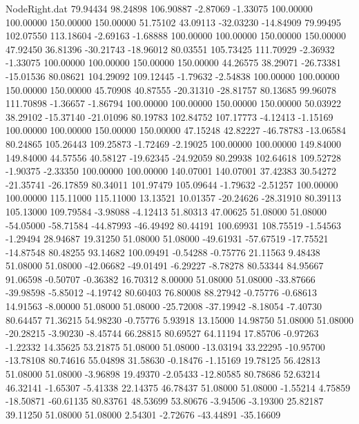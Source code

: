 \begin{filecontents}{NodeRight.dat}
  79.94434   98.24898  106.90887    -2.87069   -1.33075  100.00000  100.00000  150.00000  150.00000   51.75102   43.09113  -32.03230  -14.84909
  79.99495  102.07550  113.18604    -2.69163   -1.68888  100.00000  100.00000  150.00000  150.00000   47.92450   36.81396  -30.21743  -18.96012
  80.03551  105.73425  111.70929    -2.36932   -1.33075  100.00000  100.00000  150.00000  150.00000   44.26575   38.29071  -26.73381  -15.01536
  80.08621  104.29092  109.12445    -1.79632   -2.54838  100.00000  100.00000  150.00000  150.00000   45.70908   40.87555  -20.31310  -28.81757
  80.13685   99.96078  111.70898    -1.36657   -1.86794  100.00000  100.00000  150.00000  150.00000   50.03922   38.29102  -15.37140  -21.01096
  80.19783  102.84752  107.17773    -4.12413   -1.15169  100.00000  100.00000  150.00000  150.00000   47.15248   42.82227  -46.78783  -13.06584
  80.24865  105.26443  109.25873    -1.72469   -2.19025  100.00000  100.00000  149.84000  149.84000   44.57556   40.58127  -19.62345  -24.92059
  80.29938  102.64618  109.52728    -1.90375   -2.33350  100.00000  100.00000  140.07001  140.07001   37.42383   30.54272  -21.35741  -26.17859
  80.34011  101.97479  105.09644    -1.79632   -2.51257  100.00000  100.00000  115.11000  115.11000   13.13521   10.01357  -20.24626  -28.31910
  80.39113  105.13000  109.79584    -3.98088   -4.12413   51.80313   47.00625   51.08000   51.08000  -54.05000  -58.71584  -44.87993  -46.49492
  80.44191  100.69931  108.75519    -1.54563   -1.29494   28.94687   19.31250   51.08000   51.08000  -49.61931  -57.67519  -17.75521  -14.87548
  80.48255   93.14682  100.09491    -0.54288   -0.75776   21.11563    9.48438   51.08000   51.08000  -42.06682  -49.01491   -6.29227   -8.78278
  80.53344   84.95667   91.06598    -0.50707   -0.36382   16.70312    8.00000   51.08000   51.08000  -33.87666  -39.98598   -5.85012   -4.19742
  80.60403   76.80008   88.27942    -0.75776   -0.68613   14.91563   -8.00000   51.08000   51.08000  -25.72008  -37.19942   -8.18054   -7.40730
  80.64457   71.36215   54.98230    -0.75776    5.93918   13.15000   14.98750   51.08000   51.08000  -20.28215   -3.90230   -8.45744   66.28815
  80.69527   64.11194   17.85706    -0.97263   -1.22332   14.35625   53.21875   51.08000   51.08000  -13.03194   33.22295  -10.95700  -13.78108
  80.74616   55.04898   31.58630    -0.18476   -1.15169   19.78125   56.42813   51.08000   51.08000   -3.96898   19.49370   -2.05433  -12.80585
  80.78686   52.63214   46.32141    -1.65307   -5.41338   22.14375   46.78437   51.08000   51.08000   -1.55214    4.75859  -18.50871  -60.61135
  80.83761   48.53699   53.80676    -3.94506   -3.19300   25.82187   39.11250   51.08000   51.08000    2.54301   -2.72676  -43.44891  -35.16609

\end{filecontents}
